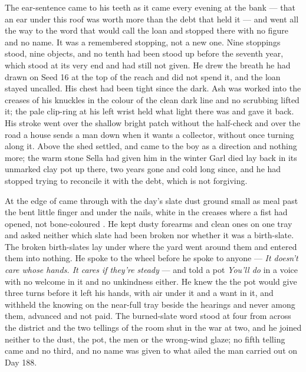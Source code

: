The ear-sentence came to his teeth as it came every evening at the bank --- that an ear under this roof was worth more than the debt that held it --- and went all the way to the word that would call the loan and stopped there with no figure and no name. It was a remembered stopping, not a new one. Nine stoppings stood, nine objects, and no tenth had been stood up before the seventh year, which stood at its very end and had still not given. He drew the breath he had drawn on Seed 16 at the top of the reach and did not spend it, and the loan stayed uncalled. His chest had been tight since the dark. Ash was worked into the creases of his knuckles in the colour of the clean dark line and no scrubbing lifted it; the pale clip-ring at his left wrist held what light there was and gave it back. His stroke went over the shallow bright patch without the half-check and over the road a house sends a man down when it wants a collector, without once turning along it. Above the shed  settled, and came to the boy as a direction and nothing more; the warm stone Sella had given him in the winter Garl died lay back in its unmarked clay pot up there, two years gone and cold long since, and he had stopped trying to reconcile it with the debt, which is not forgiving.

At the edge of   came through with the day's slate dust ground small as meal past the bent little finger and under the nails, white in the creases where a fist had opened, not bone-coloured . He kept dusty forearms and clean ones on one tray and asked neither which slate had been broken nor whether it was a birth-slate. The broken birth-slates lay under  where the yard went around them and entered them into nothing. He spoke to the wheel before he spoke to anyone --- \emph{It doesn't care whose hands. It cares if they're steady} --- and told a pot \emph{You'll do} in a voice with no welcome in it and no unkindness either. He knew the  the pot would give three turns before it left his hands, with air under it and a want in it, and withheld the knowing on the near-full tray beside the hearings and never among them, advanced and not paid. The burned-slate word stood at four from across the district and the two tellings of the room shut in the war at two, and he joined neither to the dust, the pot, the men or the wrong-wind glaze; no fifth telling came and no third, and no name was given to what ailed the man carried out on Day 188.

